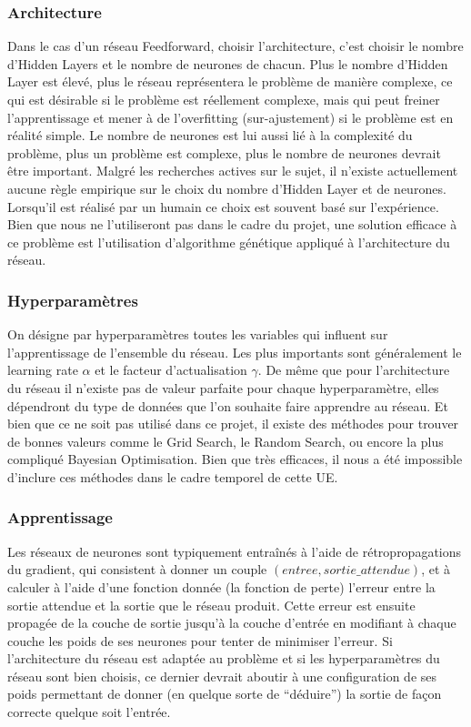 \subsubsection{Architecture}
Dans le cas d'un réseau Feedforward, choisir l'architecture, c'est choisir le nombre d'Hidden Layers et le nombre de neurones de chacun. Plus le nombre d'Hidden Layer est élevé, plus le réseau représentera le problème de manière complexe, ce qui est désirable si le problème est réellement complexe, mais qui peut freiner l'apprentissage et mener à de l'overfitting (sur-ajustement) si le problème est en réalité simple. Le nombre de neurones est lui aussi lié à la complexité du problème, plus un problème est complexe, plus le nombre de neurones devrait être important. Malgré les recherches actives sur le sujet, il n'existe actuellement aucune règle empirique sur le choix du nombre d'Hidden Layer et de neurones. Lorsqu'il est réalisé par un humain ce choix est souvent basé sur l'expérience. Bien que nous ne l'utiliseront pas dans le cadre du projet, une solution efficace à ce problème est l'utilisation d'algorithme génétique appliqué à l'architecture du réseau.

\subsubsection{Hyperparamètres}
On désigne par hyperparamètres toutes les variables qui influent sur l'apprentissage de l'ensemble du réseau. Les plus importants sont généralement le learning rate $\alpha$ et le facteur d'actualisation $\gamma$.
De même que pour l'architecture du réseau il n'existe pas de valeur parfaite pour chaque hyperparamètre, elles dépendront du type de données que l'on souhaite faire apprendre au réseau. Et bien que ce ne soit pas utilisé dans ce projet, il existe des méthodes pour trouver de bonnes valeurs comme le Grid Search, le Random Search, ou encore la plus compliqué Bayesian Optimisation. Bien que très efficaces, il nous a été impossible d'inclure ces méthodes dans le cadre temporel de cette UE.

\subsubsection{Apprentissage}
Les réseaux de neurones sont typiquement entraînés à l'aide de rétropropagations du gradient, qui consistent à donner un couple $(entree, sortie\_attendue)$, et à calculer à l'aide d'une fonction donnée (la fonction de perte) l'erreur entre la sortie attendue et la sortie que le réseau produit. Cette erreur est ensuite propagée de la couche de sortie jusqu'à la couche d'entrée en modifiant à chaque couche les poids de ses neurones pour tenter de minimiser l'erreur.
Si l'architecture du réseau est adaptée au problème et si les hyperparamètres du réseau sont bien choisis, ce dernier devrait aboutir à une configuration de ses poids permettant de donner (en quelque sorte de ``déduire'') la sortie de façon correcte quelque soit l'entrée.
\par


